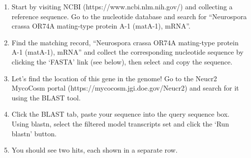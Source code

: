 \documentclass[
  letterpaper,
  DIV=11,
  numbers=noendperiod]{scrreprt}
\providecommand{\tightlist}{%
  \setlength{\itemsep}{0pt}\setlength{\parskip}{0pt}}
\begin{document}
\begin{enumerate}
\def\labelenumi{\arabic{enumi}.}
\tightlist
\item
  Start by visiting NCBI (https://www.ncbi.nlm.nih.gov/) and collecting
  a reference sequence. Go to the nucleotide database and search for
  ``Neurospora crassa OR74A mating-type protein A-1 (matA-1), mRNA''.
\item
  Find the matching record, ``Neurospora crassa OR74A mating-type
  protein A-1 (matA-1), mRNA'' and collect the corresponding nucleotide
  sequence by clicking the `FASTA' link (see below), then select and
  copy the sequence.
\item
  Let's find the location of this gene in the genome! Go to the Neucr2
  MycoCosm portal (https://mycocosm.jgi.doe.gov/Neucr2) and search for
  it using the BLAST tool.
\item
  Click the BLAST tab, paste your sequence into the query sequence box.
  Using blastn, select the filtered model transcripts set and click the
  `Run blastn' button.
\item
  You should see two hits, each shown in a separate row.


\end{enumerate}
\end{document}
